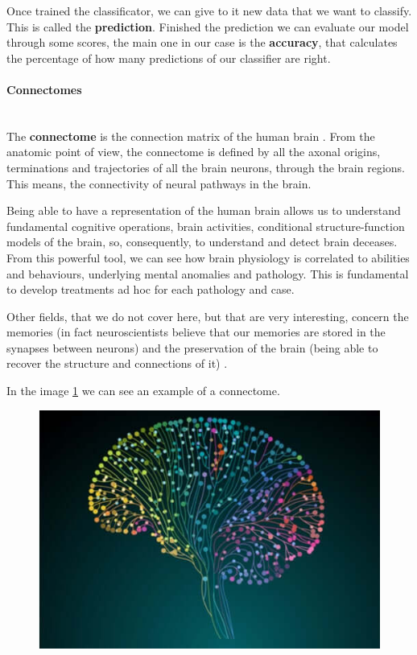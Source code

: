Once trained the classificator, we can give to it new data that we want to classify. This is called the \textbf{prediction}. Finished the prediction we can evaluate our model through some scores, the main one in our case is the \textbf{accuracy}, that calculates the percentage of how many predictions of our classifier are right. 

\paragraph{Connectomes}\
\\
The \textbf{connectome} is the connection matrix of the human brain \cite{connectome}. From the anatomic point of view, the connectome is defined by all the axonal origins, terminations and trajectories of all the brain neurons, through the brain regions. This means, the connectivity of neural pathways in the brain. 

Being able to have a representation of the human brain allows us to understand fundamental cognitive operations, brain activities, conditional structure-function models of the brain, so, consequently, to understand and detect brain deceases. From this powerful tool, we can see how brain physiology is correlated to abilities and behaviours, underlying mental anomalies and pathology. This is fundamental to develop treatments ad hoc for each pathology and case. 

Other fields, that we do not cover here, but that are very interesting, concern the memories (in fact neuroscientists believe that our memories are stored in the synapses between neurons) and the preservation of the brain (being able to recover the structure and connections of it) \cite{preservation}.

In the image \ref{fig:diagram3} we can see an example of a connectome.

\begin{figure}[htbp]
	\centering
	\includegraphics[scale=0.3]{Immagini/cervello-connessioni-neuroni-colorate.jpg}
	\caption{\label{fig:diagram3}}
\end{figure}



